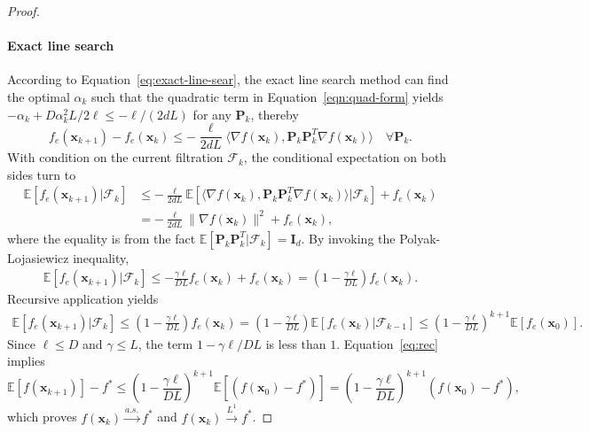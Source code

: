 \documentclass[10pt]{article} %
\numberwithin{equation}{section}
\theoremstyle{plain}
\theoremstyle{definition}
\newcommand{\<}{\langle}
\renewcommand{\>}{\rangle}
\renewcommand{\(}{\left(}
\renewcommand{\)}{\right)}
\renewcommand{\[}{\left[}
\renewcommand{\]}{\right]}
\newcommand{\Lip}{L}
\begin{document}
\begin{proof}
\paragraph{Exact line search}
According to Equation~\eqref{eq:exact-line-sear}, the exact line search method can find the optimal $\alpha_k$ such that the quadratic term in Equation~\eqref{eqn:quad-form} yields $-\alpha_k+D\alpha_k^2\Lip/2\ell \leq -\ell/(2d\Lip)$ for any $\bm P_k$, thereby
\begin{equation}
f_e(\bm x_{k+1}) - f_e(\bm x_k) \leq -\frac{\ell}{2d\Lip}\langle \nabla f(\bm x_k), \bm P_k\bm P_k^T\nabla f(\bm x_k)\rangle \quad \forall \bm P_k.
\end{equation}
With condition on the current filtration $\mathcal{F}_k$, the conditional expectation on both sides turn to
\begin{equation}
\label{eqn:exp-pf}
\begin{aligned}
\mathbb{E}[f_e(\bm x_{k+1})\vert\mathcal{F}_k]
&\leq -\frac{\ell}{2d\Lip}\mathbb{E}\left[\langle\nabla f(\bm x_k),\bm P_k\bm P_k^T\nabla f(\bm x_k)\rangle\vert\mathcal{F}_k\right] + f_e(\bm x_k)\\
&= -\frac{\ell}{2d\Lip}\lVert \nabla f(\bm x_k)\rVert^2 + f_e(\bm x_k),
\end{aligned}
\end{equation}
where the equality is from the fact $\mathbb{E}[\bm P_k\bm P_k^T\vert\mathcal{F}_k]=\bm I_d$. By invoking the Polyak-Lojasiewicz inequality,
\begin{equation}
\label{eqn:pl}
\begin{aligned}
\mathbb{E}[f_e(\bm x_{k+1})\vert\mathcal{F}_k] 
\leq -\frac{\gamma\ell}{D\Lip}f_e(\bm x_k) + f_e(\bm x_k) 
= \left(1-\frac{\gamma\ell}{D\Lip}\right)f_e(\bm x_k).
\end{aligned}
\end{equation}
Recursive application yields
\begin{equation}
\label{eq:rec}
\begin{aligned}
\mathbb{E}[f_e(\bm x_{k+1})\vert\mathcal{F}_k] 
\leq \left(1-\frac{\gamma\ell}{D\Lip}\right)f_e(\bm x_k)
= \left(1-\frac{\gamma\ell}{D\Lip}\right)\mathbb{E}[f_e(\bm x_k)\vert\mathcal{F}_{k-1}]
\leq \left(1-\frac{\gamma\ell}{D\Lip}\right)^{k+1}\mathbb{E}[f_e(\bm x_0)].
\end{aligned}
\end{equation}
Since $\ell\leq D$ and $\gamma\leq \Lip$, the term $1-\gamma\ell/D\Lip$ is less than $1$. Equation~\eqref{eq:rec} implies
\begin{equation}
\mathbb{E}\left[f(\bm x_{k+1})\right] - f^* \leq \left(1-\frac{\gamma\ell}{D\Lip}\right)^{k+1}\mathbb{E}[(f(\bm x_0) - f^*)] = \left(1-\frac{\gamma\ell}{D\Lip}\right)^{k+1}(f(\bm x_0) - f^*),
\end{equation}
which proves $f(\bm x_k)\overset{a.s.}{\to}f^*$ and $f(\bm x_k)\overset{L^1}{\to}f^*$.


\end{proof}
\end{document}
